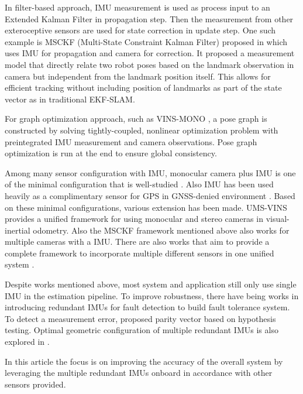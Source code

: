 \documentclass[conference]{IEEEtran}
\begin{document}
In filter-based approach, IMU measurement is used as process input to an Extended Kalman Filter in propagation step. Then the measurement from other exteroceptive sensors are used for state correction in update step. One such example is MSCKF (Multi-State Constraint Kalman Filter) proposed in \cite{Anastasios2007_MSCKF} which uses IMU for propagation and camera for correction. It proposed a measurement model that directly relate two robot poses based on the landmark observation in camera but independent from the landmark position itself. This allows for efficient tracking without including position of landmarks as part of the state vector as in traditional EKF-SLAM.

For graph optimization approach, such as VINS-MONO \cite{qin2018_vins-mono}, a pose graph is constructed by solving tightly-coupled, nonlinear optimization problem with preintegrated IMU measurement and camera observations. Pose graph optimization is run at the end to ensure global consistency.

Among many sensor configuration with IMU, monocular camera plus IMU is one of the minimal configuration that is well-studied \cite{qin2018_vins-mono, 10616216}. Also IMU has been used heavily as a complimentary sensor for GPS in GNSS-denied environment \cite{1008998, 8987949}. Based on these minimal configurations, various extension has been made. UMS-VINS \cite{jiang2023_UMS-VINS} provides a unified framework for using monocular and stereo cameras in visual-inertial odometry. Also the MSCKF framework mentioned above \cite{Anastasios2007_MSCKF} also works for multiple cameras with a IMU. There are also works that aim to provide a complete framework to incorporate multiple different sensors in one unified system \cite{10587194}.

Despite works mentioned above, most system and application still only use single IMU in the estimation pipeline. To improve robustness, there have being works in introducing redundant IMUs for fault detection to build fault tolerance system. To detect a measurement error, \cite{Sturza1988_redundant} proposed parity vector based on hypothesis testing. Optimal geometric configuration of multiple redundant IMUs is also explored in \cite{Colomina2004REDUNDANTIF, guerrier2009, xue2023}.


 In this article the focus is on improving the accuracy of the overall system by leveraging the multiple redundant IMUs onboard in accordance with other sensors provided.
\end{document}
